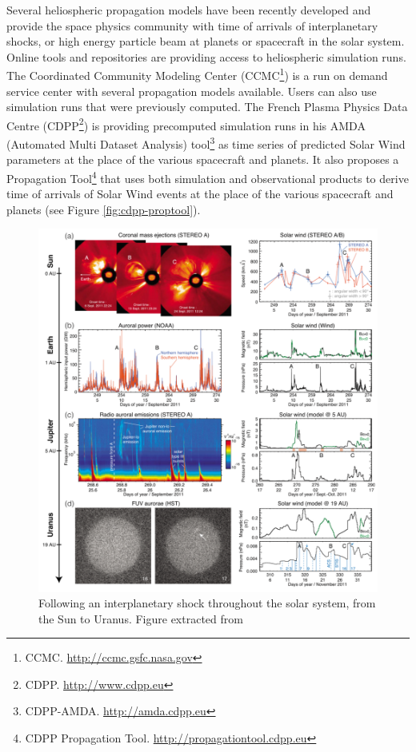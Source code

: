 \documentclass[referee,a4paper,12pt,traditabstract]{swsc}
\begin{document}
\begin{linenumbers}
Several heliospheric propagation models \citep[see, e.g., ][]{Tao05,zieger08} have been recently developed and provide the space physics community with time of arrivals of interplanetary shocks, or high energy particle beam at planets or spacecraft in the solar system. Online tools and repositories are providing access to heliospheric simulation runs. The Coordinated Community Modeling Center (CCMC\footnote{CCMC. \url{http://ccmc.gsfc.nasa.gov}}) is a run on demand service center with several propagation models available. Users can also use simulation runs that were previously computed. The French Plasma Physics Data Centre (CDPP\footnote{CDPP. \url{http://www.cdpp.eu}}) is providing precomputed simulation runs in his AMDA (Automated Multi Dataset Analysis) tool\footnote{CDPP-AMDA. \url{http://amda.cdpp.eu}} as time series of predicted Solar Wind parameters at the place of the various spacecraft and planets. It also proposes a Propagation Tool\footnote{CDPP Propagation Tool. \url{http://propagationtool.cdpp.eu}} that uses both simulation and observational products to derive time of arrivals of Solar Wind events at the place of the various spacecraft and planets (see Figure \ref{fig:cdpp-proptool}).

\begin{figure}
\centering\includegraphics[width=\linewidth]{pasted-image-1213.png}
\caption{Following an interplanetary shock throughout the solar system, from the Sun to Uranus. Figure extracted from \cite{Lamy12}}
\label{fig:ips-uranus}
\end{figure}



\end{linenumbers}
\end{document}
